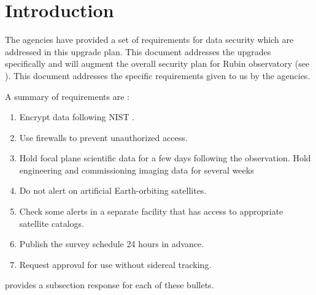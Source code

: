 \section{Introduction}

The agencies have provided a set of requirements for data security which are addressed in this upgrade plan.  This document addresses the upgrades specifically and will augment the overall security plan for Rubin observatory (see ).
This document addresses the specific requirements given to us by the agencies.

A summary of requirements are :
\begin{enumerate}

\item	Encrypt data following \gls{NIST} .
\item	Use firewalls to prevent unauthorized  access.
\item	Hold focal plane scientific data for a few days following the observation. Hold engineering and commissioning imaging data for several weeks
\item	Do not alert on artificial Earth-orbiting satellites.
\item	Check some alerts in a separate facility that has access to appropriate satellite catalogs.
\item	Publish the survey schedule 24 hours in advance.
\item	Request approval for use  without sidereal tracking.

\end{enumerate}


 provides a subsection response for each of these bullets.
